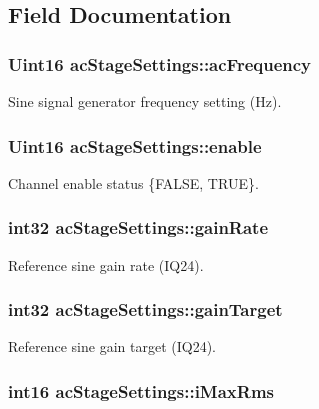 \subsection{Field Documentation}
\hypertarget{a00004_a87713ff5f537563733a303ba762fdeb5}{
\subsubsection[{ac\-Frequency}]{\setlength{\rightskip}{0pt plus 5cm}Uint16 ac\-Stage\-Settings\-::ac\-Frequency}}\label{a00004_a87713ff5f537563733a303ba762fdeb5}
Sine signal generator frequency setting (Hz). \hypertarget{a00004_a77d8744d531e699816cfcff31ccb6360}{
\subsubsection[{enable}]{\setlength{\rightskip}{0pt plus 5cm}Uint16 ac\-Stage\-Settings\-::enable}}\label{a00004_a77d8744d531e699816cfcff31ccb6360}
Channel enable status \{F\-A\-L\-S\-E, T\-R\-U\-E\}. \hypertarget{a00004_a79680d88a9281cf5f6705881261b65db}{
\subsubsection[{gain\-Rate}]{\setlength{\rightskip}{0pt plus 5cm}int32 ac\-Stage\-Settings\-::gain\-Rate}}\label{a00004_a79680d88a9281cf5f6705881261b65db}
Reference sine gain rate (I\-Q24). \hypertarget{a00004_af2ee8eeee892bf7f43e53bffdfa9993b}{
\subsubsection[{gain\-Target}]{\setlength{\rightskip}{0pt plus 5cm}int32 ac\-Stage\-Settings\-::gain\-Target}}\label{a00004_af2ee8eeee892bf7f43e53bffdfa9993b}
Reference sine gain target (I\-Q24). \hypertarget{a00004_a9a07b0fd154720204a362df5217d2079}{
\subsubsection[{i\-Max\-Rms}]{\setlength{\rightskip}{0pt plus 5cm}int16 ac\-Stage\-Settings\-::i\-Max\-Rms}}\label{a00004_a9a07b0fd154720204a362df5217d2079}
